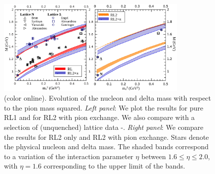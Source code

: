 \begin{figure}[t]
\begin{center}
  \includegraphics[width=0.82\textwidth,clip]{figures/eta-bands-2.eps}
 \end{center}
 \caption{(color online). Evolution of the nucleon and delta mass with respect to the pion mass squared. \textit{Left panel}: We plot the results for pure RL1 and for RL2 with pion exchange. We also compare with a selection of (unquenched) 
lattice data \cite{Alexandrou:2006ru}-\cite{Gattringer:2008vj}. \textit{Right panel}: We compare the results for RL2 only and RL2 with pion exchange. Stars denote the physical nucleon and delta mass.
The shaded bands correspond to a variation of the interaction parameter $\eta$ between
$1.6 \le \eta \le 2.0$, with $\eta=1.6$ corresponding to the upper limit of the bands.}\label{fig:mass_panel}
\end{figure}

